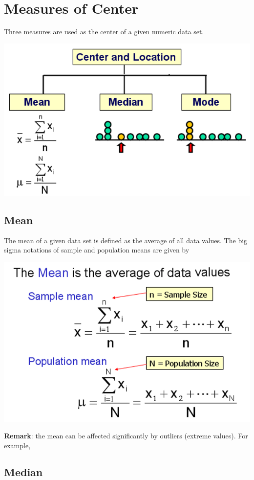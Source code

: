 \documentclass[
]{book}
\begin{document}
\hfill\break

\hypertarget{measures-of-center}{%
\section{Measures of Center}\label{measures-of-center}}

Three measures are used as the center of a given numeric data set.

\begin{center}\includegraphics[width=0.6\linewidth]{week02/measuresOfCenter} \end{center}

\hypertarget{mean}{%
\subsection{Mean}\label{mean}}

The mean of a given data set is defined as the average of all data values. The big sigma notations of sample and population means are given by

\begin{center}\includegraphics[width=0.5\linewidth]{week02/mean} \end{center}

\textbf{Remark}: the mean can be affected significantly by outliers (extreme values). For example,

\hypertarget{median}{%
\subsection{Median}\label{median}}
\end{document}
